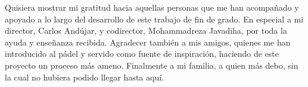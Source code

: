 \begin{acknowledgements}
    \thispagestyle{plain}
    Quisiera mostrar mi gratitud hacia aquellas personas que me han acompañado y apoyado a lo largo del desarrollo de este trabajo de fin de grado. En especial a mi director, Carlos Andújar, y codirector, Mohammadreza Javadiha, por toda la ayuda y enseñanza recibida. Agradecer también a mis amigos, quienes me han introducido al pádel y servido como fuente de inspiración, haciendo de este proyecto un proceso más ameno. Finalmente a mi familia, a quien más debo, sin la cual no hubiera podido llegar hasta aquí.
\end{acknowledgements}